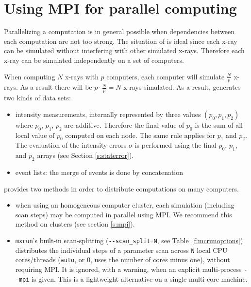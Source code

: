 \section{Using MPI for parallel computing}
\label{s:run-mpi}

Parallelizing a computation is in general possible when dependencies between
  each computation are not too strong. The situation of \MCX is
  ideal since each x-ray can be simulated without interfering with
  other simulated x-rays. Therefore each x-ray can be simulated
  independently on a set of computers.

  When computing $N$ x-rays with $p$ computers, each computer will
  simulate $\frac{N}{p}$ x-rays. As a result there will be $p \cdot
  \frac{N}{p} = N$ x-rays simulated. As a result, \MCX generates two kinds of
  data sets:
\begin{itemize}
\item intensity measurements, internally represented by three
  values $(p_0, p_1, p_2)$ where $p_0$, $p_1$, $p_2$ are
  additive. Therefore the final value of $p_0$ is the sum of all
  local value of  $p_0$ computed on each node. The same rule applies
  for $p_1$ and $p_2$. The evaluation of the intensity errors $\sigma$
  is performed using the final $p_0$, $p_1$, and $p_2$ arrays (see Section \ref{s:staterror}).
\item event lists: the merge of events is done by concatenation
\end{itemize}

\MCX provides two methods in order to distribute computations on many
computers.
\begin{itemize}
\item when using an homogeneous computer cluster, each simulation (including
  scan steps) may be computed in parallel using MPI. We recommend this method on
  clusters (see section \ref{s:mpi}).
\item \texttt{mxrun}'s built-in scan-splitting (\verb+--scan_split=N+, see
  Table~\ref{f:mcrunoptions}) distributes the individual steps of a parameter
  scan across \texttt{N} local CPU cores/threads (\texttt{auto}, or 0, uses the number of cores minus one), without requiring MPI. It is ignored, with a warning, when an explicit multi-process \verb+--mpi+ is given. This
  is a lightweight alternative on a single multi-core machine.
\end{itemize}

